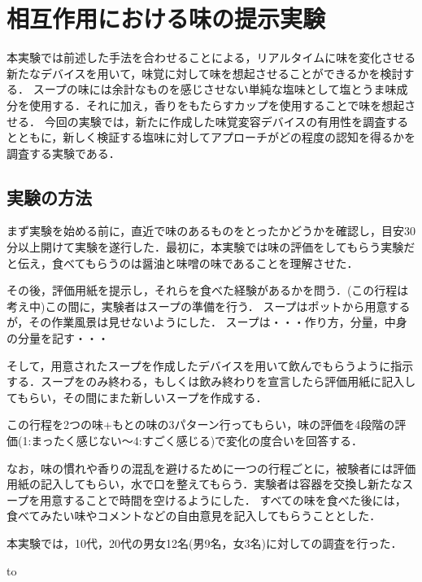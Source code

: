 \section{相互作用における味の提示実験}
本実験では前述した手法を合わせることによる，リアルタイムに味を変化させる新たなデバイスを用いて，味覚に対して味を想起させることができるかを検討する．
スープの味には余計なものを感じさせない単純な塩味として塩とうま味成分を使用する．それに加え，香りをもたらすカップを使用することで味を想起させる．
今回の実験では，新たに作成した味覚変容デバイスの有用性を調査するとともに，新しく検証する塩味に対してアプローチがどの程度の認知を得るかを調査する実験である．

\subsection{実験の方法}
まず実験を始める前に，直近で味のあるものをとったかどうかを確認し，目安30分以上開けて実験を遂行した．最初に，本実験では味の評価をしてもらう実験だと伝え，食べてもらうのは醤油と味噌の味であることを理解させた．

その後，評価用紙を提示し，それらを食べた経験があるかを問う．(この行程は考え中)この間に，実験者はスープの準備を行う．
スープはポットから用意するが，その作業風景は見せないようにした．
スープは・・・作り方，分量，中身の分量を記す・・・


そして，用意されたスープを作成したデバイスを用いて飲んでもらうように指示する．スープをのみ終わる，もしくは飲み終わりを宣言したら評価用紙に記入してもらい，その間にまた新しいスープを作成する．

この行程を2つの味+もとの味の3パターン行ってもらい，味の評価を4段階の評価(1:まったく感じない～4:すごく感じる)で変化の度合いを回答する．




なお，味の慣れや香りの混乱を避けるために一つの行程ごとに，被験者には評価用紙の記入してもらい，水で口を整えてもらう．実験者は容器を交換し新たなスープを用意することで時間を空けるようにした．
すべての味を食べた後には，食べてみたい味やコメントなどの自由意見を記入してもらうこととした．


本実験では，10代，20代の男女12名(男9名，女3名)に対しての調査を行った．

\begin{table}[tb]
\caption{質問内容}
\label{question}
\hbox to
\end{table}
